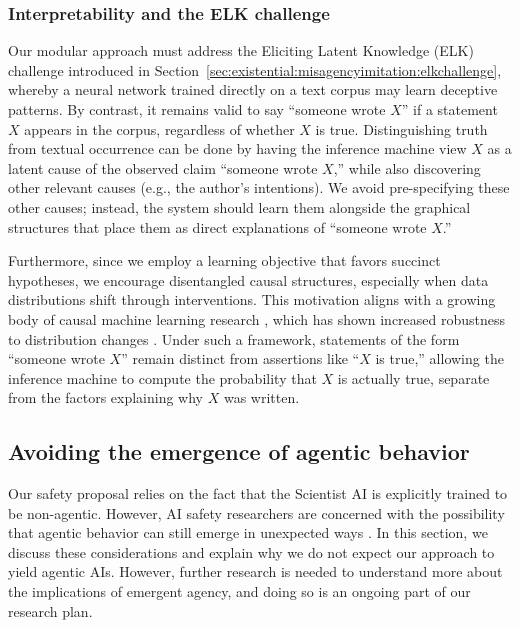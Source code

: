     \subsubsection{Interpretability and the ELK challenge}
    \label{sec:plan:latentvar:elk}
        
Our modular approach must address the Eliciting Latent Knowledge (ELK) challenge introduced in Section~\ref{sec:existential:misagencyimitation:elkchallenge}, whereby a neural network trained directly on a text corpus may learn deceptive patterns. By contrast, it remains valid to say ``someone wrote $X$'' if a statement $X$ appears in the corpus, regardless of whether $X$ is true. Distinguishing truth from textual occurrence can be done by having the inference machine view $X$ as a latent cause of the observed claim ``someone wrote $X$,'' while also discovering other relevant causes (e.g., the author’s intentions). We avoid pre-specifying these other causes; instead, the system should learn them alongside the graphical structures that place them as direct explanations of ``someone wrote $X$.''

Furthermore, since we employ a learning objective that favors succinct hypotheses, we encourage disentangled causal structures, especially when data distributions shift through interventions. This motivation aligns with a growing body of causal machine learning research \cite{library.oapen.org.handle.20.500.12657.26040,ieeexplore.ieee.org.abstract.document.9363924,royalsocietypublishing.org.doi.full.10.1098.rspa.2021.0068}, which has shown increased robustness to distribution changes \cite{openreview.net.forum.id.ryxWIgBFPS,www.jmlr.org.papers.v21.19.232.html}. Under such a framework, statements of the form ``someone wrote $X$'' remain distinct from assertions like ``$X$ is true,'' allowing the inference machine to compute the probability that $X$ is actually true, separate from the factors explaining why $X$ was written.

\subsection{Avoiding the emergence of agentic behavior}
\label{sec:plan:hiddenagency}
        
Our safety proposal relies on the fact that the Scientist AI is explicitly trained to be non-agentic. However, AI safety researchers are concerned with the possibility that agentic behavior can still emerge in unexpected ways \cite{link.springer.com.article.10.1007.s11023.012.9282.2}. In this section, we discuss these considerations and explain why we do not expect our approach to yield agentic AIs. However, further research is needed to understand more about the implications of emergent agency, and doing so is an ongoing part of our research plan.

